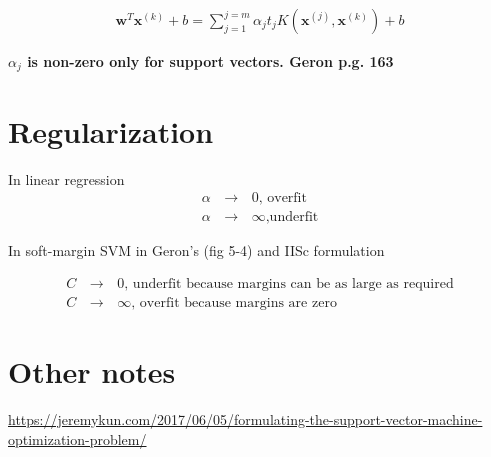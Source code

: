 \documentclass{article}
\newcommand{\ber}{\begin{eqnarray}}
\newcommand{\eer}{\end{eqnarray}}
\begin{document}
\ber
\pmb{w}^T{\pmb{x}^{(k)}} + b = \sum_{j=1}^{j=m}  \alpha_j t_j K(\pmb{x}^{(j)},\pmb{x}^{(k)}) + b
\eer

\textbf{$\alpha_j$ is non-zero only for support vectors. Geron p.g. 163}

\section{ Regularization }

In linear regression
\ber
\alpha\,&\rightarrow&\,{0} \text{, overfit }\\
\alpha\,&\rightarrow&\,{\infty} \text{,underfit}
\eer

In soft-margin SVM in Geron's (fig 5-4) and IISc formulation

\ber
C\,&\rightarrow&\,{0} \text{, underfit because margins can be as large as required} \\
C\,&\rightarrow&\,{\infty} \text{, overfit because margins are zero} 
\eer

\section{Other notes}
\url{https://jeremykun.com/2017/06/05/formulating-the-support-vector-machine-optimization-problem/}
\end{document}
